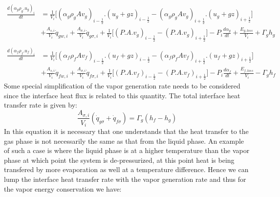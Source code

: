 \documentclass[11pt,letterpaper,titlepage]{article}
\newcommand{\half}{\frac{1}{2}}
\begin{document}
\begin{equation*}
\begin{aligned}
\frac{d(\alpha_g\rho_g.u_g)_i}{dt} &=\frac{1}{V_i}\biggr[ (\alpha_g\rho_g Av_g)_{i-\half}.(u_g+gz)_{i-\half} - (\alpha_g\rho_g Av_g)_{i+\half}.(u_g+gz)_{i+\half} \biggr] \\
&+\frac{A_{s,i}}{V_i}\dot{q}_{gw,i}+\frac{A_{\sigma ,i}}{V_i}\dot{q}_{g\sigma, i} + \frac{1}{V_i}\biggr[   (P.A.v_g)_{i-\half} - (P.A.v_g)_{i+\half}   \biggr] - P_i \frac{d\alpha_g}{dt} + \frac{E_{g,loss}}{V_i}
+\Gamma_g h_g\\
\end{aligned}
\end{equation*}
\vspace{0.5cm}
\begin{equation*}
\begin{aligned}
\frac{d(\alpha_f\rho_f.u_f)_i}{dt} &=\frac{1}{V_i}\biggr[ (\alpha_f\rho_f Av_f)_{i-\half}.(u_f+gz)_{i-\half} - (\alpha_f\rho_f Av_f)_{i+\half}.(u_f+gz)_{i+\half} \biggr] \\
&+\frac{A_{s,i}}{V_i}\dot{q}_{fw,i}+\frac{A_{\sigma ,i}}{V_i}\dot{q}_{f\sigma, i} + \frac{1}{V_i}\biggr[   (P.A.v_f)_{i-\half} - (P.A.v_f)_{i+\half}   \biggr] - P_i \frac{d\alpha_f}{dt} + \frac{E_{f,loss}}{V_i}
-\Gamma_g h_f
\end{aligned}
\end{equation*}
\newline 
\newline
\noindent
Some special simplification of the vapor generation rate needs to be considered since the interface heat flux is related to this quantity. The total interface heat transfer rate is given by:
\begin{equation*}
\frac{A_{\sigma,i}}{V_i} (\dot{q}_{g\sigma} + \dot{q}_{f\sigma})=\Gamma_g (h_f - h_g)
\end{equation*}
\newline
\noindent In this equation it is necessary that one understands that the heat transfer to the gas phase is not necessarily the same as that from the liquid phase. An example of such a case is where the liquid phase is at a higher temperature than the vapor phase at which point the system is de-pressurized, at this point heat is being transfered by more evaporation as well at a temperature difference. 
\newline
\newline
\noindent
Hence we can lump the interface heat transfer rate with the vapor generation rate and thus for the vapor energy conservation we have:
\end{document}
